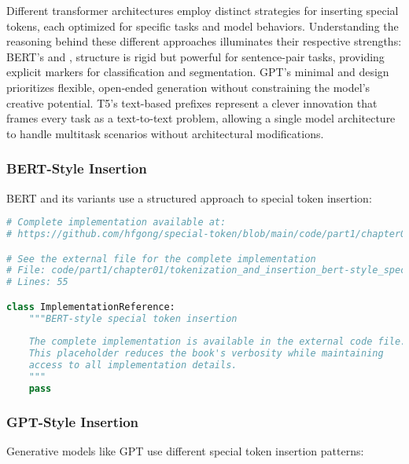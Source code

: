 Different transformer architectures employ distinct strategies for inserting special tokens, each optimized for specific tasks and model behaviors. Understanding the reasoning behind these different approaches illuminates their respective strengths: BERT's \cls{} and \sep{} structure is rigid but powerful for sentence-pair tasks, providing explicit markers for classification and segmentation. GPT's minimal \sos{} and \eos{} design prioritizes flexible, open-ended generation without constraining the model's creative potential. T5's text-based prefixes represent a clever innovation that frames every task as a text-to-text problem, allowing a single model architecture to handle multitask scenarios without architectural modifications.

\subsubsection{BERT-Style Insertion}

BERT and its variants use a structured approach to special token insertion:

\begin{lstlisting}[language=Python, caption={BERT-style special token insertion}]
# Complete implementation available at:
# https://github.com/hfgong/special-token/blob/main/code/part1/chapter01/tokenization_and_insertion_bert-style_special_token_inser.py

# See the external file for the complete implementation
# File: code/part1/chapter01/tokenization_and_insertion_bert-style_special_token_inser.py
# Lines: 55

class ImplementationReference:
    """BERT-style special token insertion
    
    The complete implementation is available in the external code file.
    This placeholder reduces the book's verbosity while maintaining
    access to all implementation details.
    """
    pass
\end{lstlisting}

\subsubsection{GPT-Style Insertion}

Generative models like GPT use different special token insertion patterns:

